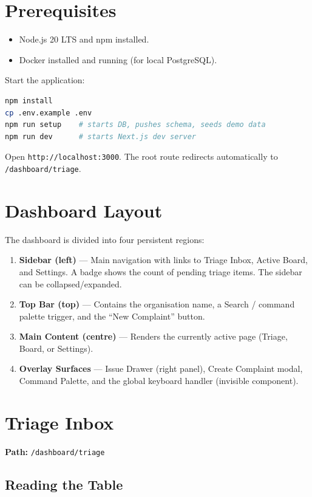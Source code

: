 \documentclass[12pt,a4paper]{report}
\begin{document}
\section{Prerequisites}

\begin{itemize}
  \item Node.js 20 LTS and npm installed.
  \item Docker installed and running (for local PostgreSQL).
\end{itemize}

Start the application:
\begin{lstlisting}[language=bash]
npm install
cp .env.example .env
npm run setup    # starts DB, pushes schema, seeds demo data
npm run dev      # starts Next.js dev server
\end{lstlisting}
Open \texttt{http://localhost:3000}.  The root route redirects automatically
to \texttt{/dashboard/triage}.

\section{Dashboard Layout}

The dashboard is divided into four persistent regions:

\begin{enumerate}
  \item \textbf{Sidebar (left)} --- Main navigation with links to Triage Inbox,
    Active Board, and Settings.  A badge shows the count of pending triage
    items.  The sidebar can be collapsed/expanded.
  \item \textbf{Top Bar (top)} --- Contains the organisation name, a Search /
    command palette trigger, and the ``New Complaint'' button.
  \item \textbf{Main Content (centre)} --- Renders the currently active page
    (Triage, Board, or Settings).
  \item \textbf{Overlay Surfaces} --- Issue Drawer (right panel), Create
    Complaint modal, Command Palette, and the global keyboard handler (invisible
    component).
\end{enumerate}

\section{Triage Inbox}

\textbf{Path:} \texttt{/dashboard/triage}

\subsection{Reading the Table}
\end{document}
